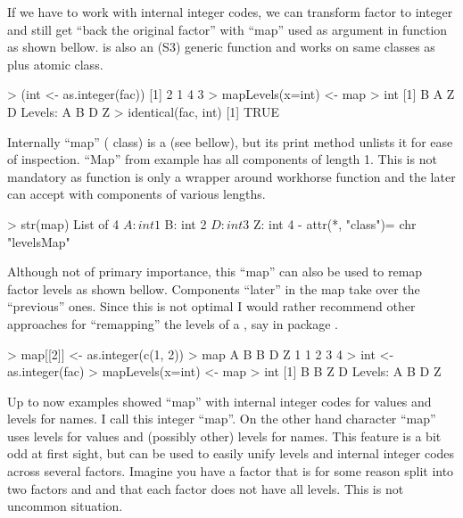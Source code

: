 \documentclass[a4paper]{report}
\begin{document}
\begin{article}
If we have to work with internal integer codes, we can transform factor to
integer and still get ``back the original factor'' with ``map'' used as
argument in  function as shown bellow. 
is also an (S3) generic function and works on same classes as
 plus  atomic class.

\begin{smallverbatim}
> (int <- as.integer(fac))
[1] 2 1 4 3
> mapLevels(x=int) <- map
> int
[1] B A Z D
Levels: A B D Z
> identical(fac, int)
[1] TRUE
\end{smallverbatim}

Internally ``map'' ( class) is a  (see bellow),
but its print method unlists it for ease of inspection. ``Map'' from
example has all components of length 1. This is not mandatory as
 function is only a wrapper around workhorse function
 and the later can accept  with components of
various lengths.

\begin{smallverbatim}
> str(map)
List of 4
 $ A: int 1
 $ B: int 2
 $ D: int 3
 $ Z: int 4
 - attr(*, "class")= chr "levelsMap"
\end{smallverbatim}

Although not of primary importance, this ``map'' can also be used to remap
factor levels as shown bellow.  Components ``later'' in the map take over
the ``previous'' ones. Since this is not optimal I would rather recommend
other approaches for ``remapping'' the levels of a , say
 in  package \citep{FoxCar}.

\begin{smallverbatim}
> map[[2]] <- as.integer(c(1, 2))
> map
A B B D Z
1 1 2 3 4
> int <- as.integer(fac)
> mapLevels(x=int) <- map
> int
[1] B B Z D
Levels: A B D Z
\end{smallverbatim}

Up to now examples showed ``map'' with internal integer codes for values
and levels for names. I call this integer ``map''. On the other hand
character ``map'' uses levels for values and (possibly other) levels for
names. This feature is a bit odd at first sight, but can be used to easily
unify levels and internal integer codes across several factors.  Imagine
you have a factor that is for some reason split into two factors 
and  and that each factor does not have all levels. This is not
uncommon situation.


\end{article}
\end{document}
